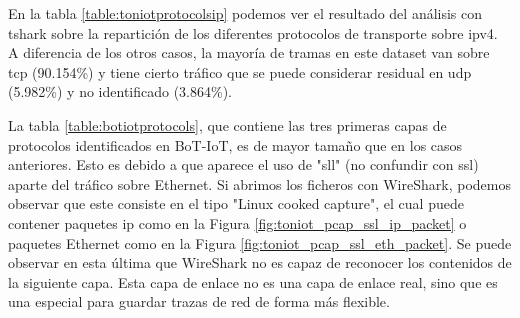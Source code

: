 En la tabla \ref{table:toniotprotocolsip} podemos ver el resultado del análisis con tshark sobre la repartición de los diferentes protocolos de transporte sobre \acrshort{ipv4}. A diferencia de los otros casos, la mayoría de tramas en este dataset van sobre \acrshort{tcp} (90.154\%) y tiene cierto tráfico que se puede considerar residual en \acrshort{udp} (5.982\%) y no identificado (3.864\%).



La tabla \ref{table:botiotprotocols}, que contiene las tres primeras capas de protocolos identificados en BoT-IoT, es de mayor tamaño que en los casos anteriores. Esto es debido a que aparece el uso de "sll" (no confundir con \acrshort{ssl}) aparte del tráfico sobre Ethernet. Si abrimos los ficheros con WireShark, podemos observar que este consiste en el tipo "Linux cooked capture", el cual puede contener paquetes \acrshort{ip} como en la Figura \ref{fig:toniot_pcap_ssl_ip_packet} o paquetes Ethernet como en la Figura \ref{fig:toniot_pcap_ssl_eth_packet}. Se puede observar en esta última que WireShark no es capaz de reconocer los contenidos de la siguiente capa. Esta capa de enlace no es una capa de enlace real, sino que es una especial para guardar trazas de red de forma más flexible. 

